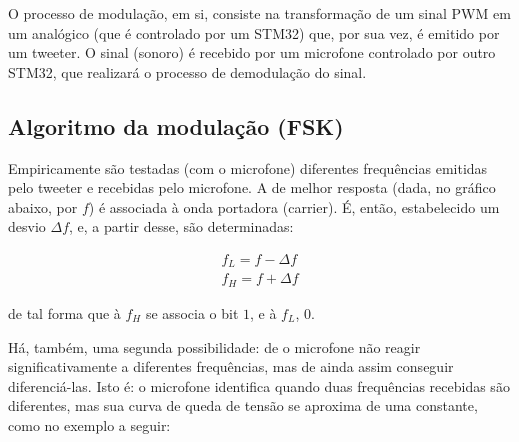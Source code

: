 \documentclass[11pt,a4paper]{report}
\begin{document}
	
	O processo de modulação, em si, consiste na transformação de um sinal PWM em um analógico (que é controlado por um STM32) que, por sua vez, é emitido por um tweeter. O sinal (sonoro) é recebido por um microfone controlado por outro STM32, que realizará o processo de demodulação do sinal.
	\subsection{Algoritmo da modulação (FSK)}	

	Empiricamente são testadas (com o microfone) diferentes frequências emitidas pelo tweeter e recebidas pelo microfone. A de melhor resposta (dada, no gráfico abaixo, por $f$) é associada à onda portadora (carrier). É, então, estabelecido um desvio $\Delta{f}$, e, a partir desse, são determinadas:
	\begin{center}
		\begin{align*}
		f_L = f - \Delta{f}\\
		f_H = f + \Delta{f}
		\end{align*}
	\end{center}
	de tal forma que à $f_H$ se associa o bit $1$, e à $f_L$, $0$.
	

	
	\begin{center}
	\end{center}


Há, também, uma segunda possibilidade: de o microfone não reagir significativamente a diferentes frequências, mas de ainda assim conseguir diferenciá-las. Isto é: o microfone identifica quando duas frequências recebidas são diferentes, mas sua curva de queda de tensão se aproxima de uma constante, como no exemplo a seguir:


\begin{center}
\end{center}
\end{document}
